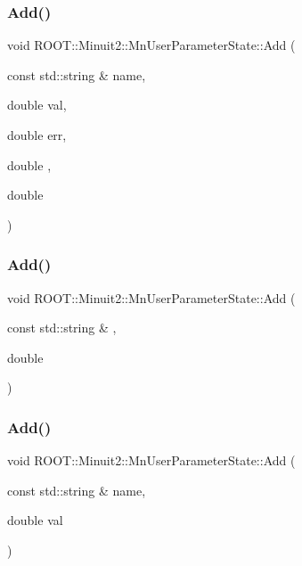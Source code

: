 \subsubsection{\texorpdfstring{Add()}{Add()}\hspace{0.1cm}{\footnotesize\ttfamily [4/6]}}
{\footnotesize\ttfamily void R\+O\+O\+T\+::\+Minuit2\+::\+Mn\+User\+Parameter\+State\+::\+Add (\begin{DoxyParamCaption}\item[{const std\+::string \&}]{name,  }\item[{double}]{val,  }\item[{double}]{err,  }\item[{double}]{,  }\item[{double}]{ }\end{DoxyParamCaption})}

\mbox{\label{classROOT_1_1Minuit2_1_1MnUserParameterState_a553bf18d39208bf83a8d7898176b20e6}} 
\subsubsection{\texorpdfstring{Add()}{Add()}\hspace{0.1cm}{\footnotesize\ttfamily [5/6]}}
{\footnotesize\ttfamily void R\+O\+O\+T\+::\+Minuit2\+::\+Mn\+User\+Parameter\+State\+::\+Add (\begin{DoxyParamCaption}\item[{const std\+::string \&}]{,  }\item[{double}]{ }\end{DoxyParamCaption})}

\mbox{\label{classROOT_1_1Minuit2_1_1MnUserParameterState_a553bf18d39208bf83a8d7898176b20e6}} 
\subsubsection{\texorpdfstring{Add()}{Add()}\hspace{0.1cm}{\footnotesize\ttfamily [6/6]}}
{\footnotesize\ttfamily void R\+O\+O\+T\+::\+Minuit2\+::\+Mn\+User\+Parameter\+State\+::\+Add (\begin{DoxyParamCaption}\item[{const std\+::string \&}]{name,  }\item[{double}]{val }\end{DoxyParamCaption})}

